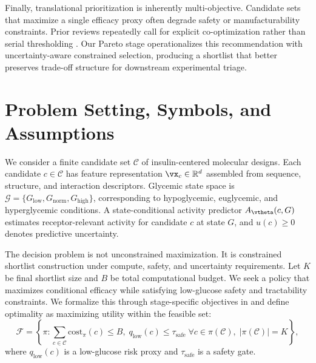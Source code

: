 \documentclass{article} %
\begin{document}
Finally, translational prioritization is inherently multi-objective. Candidate sets that maximize a single efficacy proxy often degrade safety or manufacturability constraints. Prior reviews repeatedly call for explicit co-optimization rather than serial thresholding \citep{src10,src11,src15}. Our Pareto stage operationalizes this recommendation with uncertainty-aware constrained selection, producing a shortlist that better preserves trade-off structure for downstream experimental triage.

\section{Problem Setting, Symbols, and Assumptions}
\label{sec:problem}
We consider a finite candidate set $\mathcal{C}$ of insulin-centered molecular designs. Each candidate $c \in \mathcal{C}$ has feature representation $\vx_c \in \mathbb{R}^d$ assembled from sequence, structure, and interaction descriptors. Glycemic state space is $\mathcal{G}=\{G_{\mathrm{low}},G_{\mathrm{norm}},G_{\mathrm{high}}\}$, corresponding to hypoglycemic, euglycemic, and hyperglycemic conditions. A state-conditional activity predictor $A_{\vtheta}(c,G)$ estimates receptor-relevant activity for candidate $c$ at state $G$, and $u(c)\ge 0$ denotes predictive uncertainty.

The decision problem is not unconstrained maximization. It is constrained shortlist construction under compute, safety, and uncertainty requirements. Let $K$ be final shortlist size and $B$ be total computational budget. We seek a policy that maximizes conditional efficacy while satisfying low-glucose safety and tractability constraints. We formalize this through stage-specific objectives in  and define optimality as maximizing utility within the feasible set:
\begin{equation}
\mathcal{F} = \left\{\pi : \sum_{c\in\mathcal{C}} \mathrm{cost}_{\pi}(c) \le B,\; q_{\mathrm{low}}(c)\le \tau_{\mathrm{safe}}\;\forall c\in\pi(\mathcal{C}),\; |\pi(\mathcal{C})|=K\right\},
\label{eq:feasible}
\end{equation}
where $q_{\mathrm{low}}(c)$ is a low-glucose risk proxy and $\tau_{\mathrm{safe}}$ is a safety gate.
\end{document}
